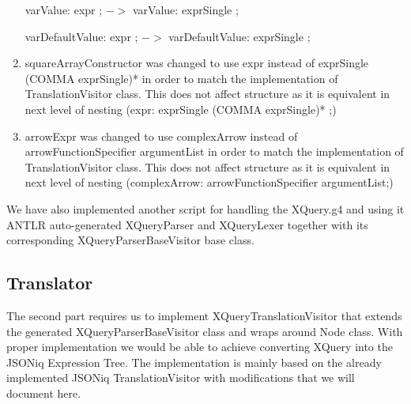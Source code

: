 \begin{enumerate}
	varValue: expr ; $->$ varValue: exprSingle ;
	
	varDefaultValue: expr ; $->$ varDefaultValue: exprSingle ;
	
	\item squareArrayConstructor was changed to use expr instead of exprSingle (COMMA exprSingle)* in order to match the implementation of TranslationVisitor class. This does not affect structure as it is equivalent in next level of nesting (expr: exprSingle (COMMA exprSingle)* ;)
	
	\item arrowExpr was changed to use complexArrow instead of arrowFunctionSpecifier argumentList in order to match the implementation of TranslationVisitor class. This does not affect structure as it is equivalent in next level of nesting (complexArrow: arrowFunctionSpecifier argumentList;)
\end{enumerate}

We have also implemented another script for handling the XQuery.g4 and using it ANTLR auto-generated XQueryParser and XQueryLexer together with its corresponding XQueryParserBaseVisitor base class.

\subsection{Translator}
The second part requires us to implement XQueryTranslationVisitor that extends the generated XQueryParserBaseVisitor class and wraps around Node class. With proper implementation we would be able to achieve converting XQuery into the JSONiq Expression Tree. The implementation is mainly based on the already implemented JSONiq TranslationVisitor with modifications that we will document here.

